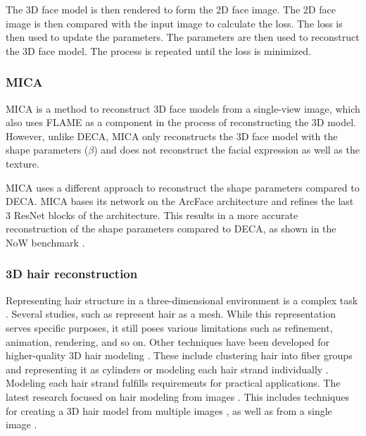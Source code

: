 The 3D face model is then rendered to form the 2D face image. The 2D face image is then compared with the input image to calculate the loss. The loss is then used to update the parameters. The parameters are then used to reconstruct the 3D face model. The process is repeated until the loss is minimized.

\subsubsection{MICA}

MICA \cite{zielonkaMetricalReconstructionHuman2022} is a method to reconstruct 3D face models from a single-view image, which also uses FLAME as a component in the process of reconstructing the 3D model. However, unlike DECA, MICA only reconstructs the 3D face model with the shape parameters ($\beta$) and does not reconstruct the facial expression as well as the texture.

MICA uses a different approach to reconstruct the shape parameters compared to DECA. MICA bases its network on the ArcFace architecture \cite{dengSubcenterArcFaceBoosting2020} and refines the last 3 ResNet blocks of the architecture. This results in a more accurate reconstruction of the shape parameters compared to DECA, as shown in the NoW benchmark \cite{RingNet:CVPR:2019}.


\subsubsection{3D hair reconstruction}
Representing hair structure in a three-dimensional environment is a complex task \cite{hairsurvey}. Several studies, such as \cite{retinaface,facegcn,pifu,3dhmr} represent hair as a mesh. While this representation serves specific purposes, it still poses various limitations such as refinement, animation, rendering, and so on.
Other techniques have been developed for higher-quality 3D hair modeling \cite{hairsurvey}. These include clustering hair into fiber groups and representing it as cylinders \cite{cluster} or modeling each hair strand individually \cite{hairsurvey}. Modeling each hair strand fulfills requirements for practical applications.
The latest research focused on hair modeling from images \cite{imgbasesurvey}. This includes techniques for creating a 3D hair model from multiple images \cite{multihair1}, as well as from a single image \cite{hairimg1,hairimg2,hairimg4}.


